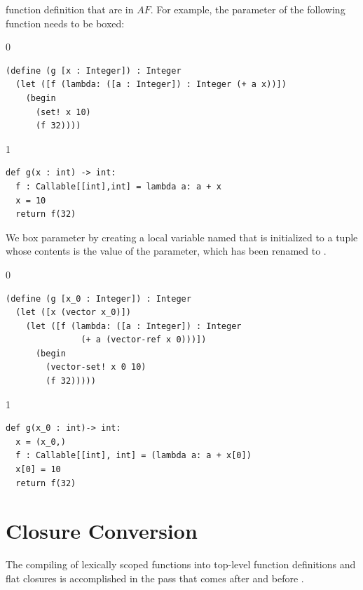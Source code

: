 \documentclass[7x10]{TimesAPriori_MIT}%
\def\racketEd{0}
\def\pythonEd{1}
\def\edition{1}
\newcommand{\pythonColor}[0]{}
\numberwithin{theorem}{chapter}
\numberwithin{definition}{chapter}
\numberwithin{equation}{chapter}
\begin{document}
function definition that are in $\mathit{AF}$. For example,
the parameter  of the following function 
needs to be boxed:
{\if\edition\racketEd
\begin{lstlisting}
(define (g [x : Integer]) : Integer
  (let ([f (lambda: ([a : Integer]) : Integer (+ a x))])
    (begin
      (set! x 10)
      (f 32))))
\end{lstlisting}
\fi}
%
{\if\edition\pythonEd\pythonColor
\begin{lstlisting}
def g(x : int) -> int:
  f : Callable[[int],int] = lambda a: a + x
  x = 10
  return f(32)
\end{lstlisting}
\fi}
%
\noindent We box parameter  by creating a local variable named
 that is initialized to a tuple whose contents is the value of
the parameter, which has been renamed to .
%
{\if\edition\racketEd
\begin{lstlisting}
(define (g [x_0 : Integer]) : Integer
  (let ([x (vector x_0)])
    (let ([f (lambda: ([a : Integer]) : Integer
               (+ a (vector-ref x 0)))])
      (begin 
        (vector-set! x 0 10)
        (f 32)))))
\end{lstlisting}
\fi}
%
{\if\edition\pythonEd\pythonColor
\begin{lstlisting}
def g(x_0 : int)-> int:
  x = (x_0,)
  f : Callable[[int], int] = (lambda a: a + x[0])
  x[0] = 10
  return f(32)
\end{lstlisting}
\fi}

\section{Closure Conversion}
\label{sec:closure-conversion}

The compiling of lexically scoped functions into top-level function
definitions and flat closures is accomplished in the pass
 that comes after 
and before .
\end{document}
